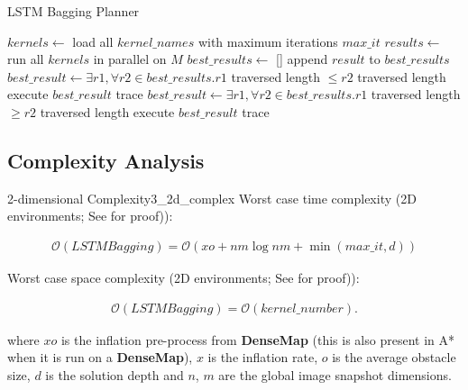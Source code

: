 \begin{algorithm}[]
\caption{LSTM Bagging Planner}
\label{alg: lstm bagging}
\begin{algorithmic}[1]
    \State $kernels \gets$ load all $kernel\_names$ with maximum iterations $max\_it$
    \State $results \gets$ run all $kernels$ in parallel on $M$
    \State $best\_results \gets$ []
    \State
            \State append $result$ to $best\_results$
        \EndIf
    \EndFor
    \State
    \State $best\_result \gets \exists r1,\forall r2 \in best\_results. r1$ traversed length
    $\leq r2$ traversed length
    \State
        \State execute $best\_result$ trace
        \State \Return
    \EndIf
    \State
    \State $best\_result \gets \exists r1,\forall r2 \in best\_results. r1$ traversed length
    $\geq r2$ traversed length
    \State
    \State execute $best\_result$ trace
\EndProcedure
\end{algorithmic}
\end{algorithm}

\pagebreak

\subsection{Complexity Analysis}

\begin{Theo}{2-dimensional Complexity}{3_2d_complex}
Worst case time complexity (2D environments; See  for proof)):

\begin{align*}
    \mathcal{O}(LSTMBagging) = \mathcal{O}(xo + nm \log nm + \min(max\_it, d))
\end{align*}



Worst case space complexity (2D environments; See  for proof)):

\begin{align*}
    \mathcal{O}(LSTMBagging) = \mathcal{O}(kernel\_number).
\end{align*}

where $xo$ is the inflation pre-process from \textbf{DenseMap} (this is also present in A* when it is run on a \textbf{DenseMap}), $x$ is the inflation rate, $o$ is the average obstacle size, $d$ is the solution depth and $n$, $m$ are the global image snapshot dimensions.

\end{Theo}

